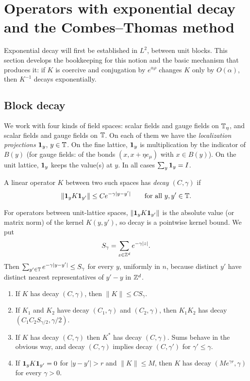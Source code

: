 \section{Operators with exponential decay and the Combes--Thomas method}\label{sec:decay}

Exponential decay will first be established in $L^2$, between unit blocks. This section develops the bookkeeping for this notion and the basic mechanism that produces it: if $K$ is coercive and conjugation by $e^{\alpha\rho}$ changes $K$ only by $O(\alpha)$, then $K^{-1}$ decays exponentially.

\subsection{Block decay}\label{ss:5.1}

We work with four kinds of field spaces: scalar fields and gauge fields on $\mathbb T_\eta$, and scalar fields and gauge fields on $\mathbb T$. On each of them we have the \emph{localization projections} $\mathbf 1_y$, $y\in\mathbb T$. On the fine lattice, $\mathbf 1_y$ is multiplication by the indicator of $B(y)$ (for gauge fields: of the bonds $(x,x+\eta e_\mu)$ with $x\in B(y)$). On the unit lattice, $\mathbf 1_y$ keeps the value(s) at $y$. In all cases $\sum_y\mathbf 1_y=I$.

\begin{definition}\label{def:decay}
A linear operator $K$ between two such spaces has \emph{decay $(C,\gamma)$} if
\[
\|\mathbf 1_yK\mathbf 1_{y'}\|\le Ce^{-\gamma|y-y'|}\qquad\text{for all }y,y'\in\mathbb T .
\]
\end{definition}

For operators between unit-lattice spaces, $\|\mathbf 1_yK\mathbf 1_{y'}\|$ is the absolute value (or matrix norm) of the kernel $K(y,y')$, so decay is a pointwise kernel bound. We put
\[
S_\gamma=\sum_{z\in\mathbb Z^d}e^{-\gamma|z|}.
\]
Then $\sum_{y'\in\mathbb T}e^{-\gamma|y-y'|}\le S_\gamma$ for every $y$, uniformly in $n$, because distinct $y'$ have distinct nearest representatives of $y'-y$ in $\mathbb Z^d$.

\begin{lemma}\label{lem:decay-calculus}
\begin{enumerate}[label=(\alph*)]
\item If $K$ has decay $(C,\gamma)$, then $\|K\|\le CS_\gamma$.
\item If $K_1$ and $K_2$ have decay $(C_1,\gamma)$ and $(C_2,\gamma)$, then $K_1K_2$ has decay $(C_1C_2S_{\gamma/2},\gamma/2)$.
\item If $K$ has decay $(C,\gamma)$ then $K^*$ has decay $(C,\gamma)$. Sums behave in the obvious way, and decay $(C,\gamma)$ implies decay $(C,\gamma')$ for $\gamma'\le\gamma$.
\item If $\mathbf 1_yK\mathbf 1_{y'}=0$ for $|y-y'|>r$ and $\|K\|\le M$, then $K$ has decay $(Me^{\gamma r},\gamma)$ for every $\gamma>0$.
\end{enumerate}
\end{lemma}

